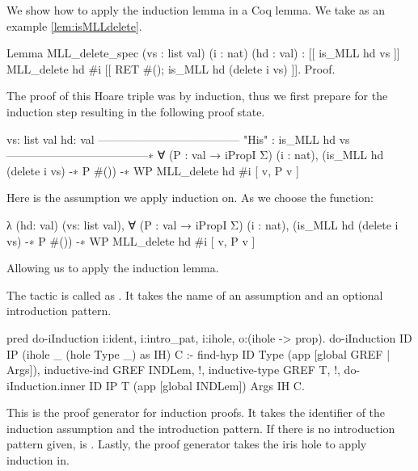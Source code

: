 \documentclass[thesis.tex]{subfiles}
\begin{document}
{\begin{example}{}{}
  We show how to apply the induction lemma in a Coq lemma.
  We take as an example \cref{lem:isMLLdelete}.
  \begin{coqcode}
    Lemma MLL_delete_spec (vs : list val) 
                          (i : nat) (hd : val) :
      [[{ is_MLL hd vs }]]
        MLL_delete hd #i
      [[{ RET #(); is_MLL hd (delete i vs) }]].
    Proof.
  \end{coqcode}
  The proof of this Hoare triple was by induction, thus we first prepare for the induction step resulting in the following proof state.
  \begin{coqcode}
    vs: list val
    hd: val
    --------------------------------------
    "His" : is_MLL hd vs
    --------------------------------------∗
    ∀ (P : val → iPropI Σ) (i : nat),
      (is_MLL hd (delete i vs) -∗ P #()) -∗ 
      WP MLL_delete hd #i [{ v, P v }]
  \end{coqcode}
  Here  is the assumption we apply induction on. As  we choose the function:
  \begin{coqcode}
    λ (hd: val) (vs: list val), 
      ∀ (P : val → iPropI Σ) (i : nat),
        (is_MLL hd (delete i vs) -∗ P #()) -∗ 
        WP MLL_delete hd #i [{ v, P v }]
  \end{coqcode}
  Allowing us to apply the induction lemma.
\end{example}

The  tactic is called as . It takes the name of an assumption and an optional introduction pattern.
\begin{elpicode}
  pred do-iInduction i:ident, i:intro_pat, i:ihole, 
                     o:(ihole -> prop).
  do-iInduction ID IP (ihole _ (hole Type _) as IH) C :-
    find-hyp ID Type (app [global GREF | Args]),
    inductive-ind GREF INDLem, !,
    inductive-type GREF T, !,
    do-iInduction.inner ID IP T (app [global INDLem]) 
                        Args IH C.
\end{elpicode}
This is the proof generator for induction proofs. It takes the identifier of the induction assumption and the introduction pattern. If there is no introduction pattern given,  is . Lastly, the proof generator takes the iris hole to apply induction in.

}
\end{document}
